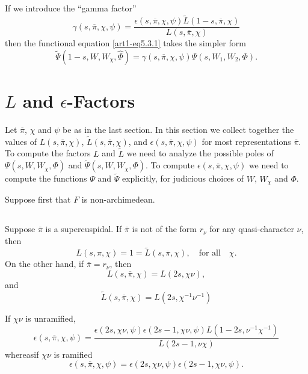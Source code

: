 \subsection{}\label{art1-sec5.5}
If we introduce the ``gamma factor''
$$
\gamma(s,\overline{\pi},\chi,\psi)=\dfrac{\epsilon(s,\overline{\pi},\chi,\psi)\widetilde{L}(1-s,\overline{\pi},\chi)}{L(s,\overline{\pi},\chi)}
$$
then the functional equation \eqref{art1-eq5.3.1} takes the simpler form
$$
\widetilde{\Psi}(1-s,W,W_{\chi},\widehat{\Phi})=\gamma(s,\overline{\pi},\chi,\psi)\Psi(s,W_{1},W_{2},\Phi).
$$

\section{$L$ and $\epsilon$-Factors}\label{art1-sec6}

Let $\overline{\pi}$, $\chi$ and $\psi$ be as in the last section. In this section we collect together the values of $L(s,\overline{\pi},\chi)$, $\widetilde{L}(s,\overline{\pi},\chi)$, and $\epsilon(s,\overline{\pi},\chi,\psi)$ for most representations $\overline{\pi}$. To compute the factors $L$ and $\widetilde{L}$ we need to analyze the possible poles of $\Psi(s,W,W_{\chi},\Phi)$ and $\widetilde{\Psi}(s,W,W_{\chi},\Phi)$. To compute $\epsilon(s,\overline{\pi},\chi,\psi)$ we need to compute the functions $\Psi$ and $\widetilde{\Psi}$ explicitly, for judicious choices of $W$, $W_{\chi}$ and $\Phi$.

Suppose first that $F$ is non-archimedean.

\subsection{}\label{art1-sec6.1}
Suppose $\overline{\pi}$ is a supercuspidal. If $\overline{\pi}$ is not of the form $r_{\nu}$ for any quasi-character $\nu$, then
$$
L(s,\pi,\chi)=1=\widetilde{L}(s,\overline{\pi},\chi),\quad\text{for all}\quad \chi.
$$
On the other hand, if $\overline{\pi}=r_{\nu}$, then
$$
L(s,\overline{\pi},\chi)=L(2s,\chi\nu),
$$
and
$$
\widetilde{L}(s,\overline{\pi},\chi)=L(2s,\chi^{-1}\nu^{-1})
$$

If $\chi\nu$ is unramified,
$$
\epsilon(s,\overline{\pi},\chi,\psi)=\frac{\epsilon(2s,\chi\nu,\psi)\epsilon(2s-1,\chi\nu,\psi)L(1-2s,\nu^{-1}\chi^{-1})}{L(2s-1,\nu\chi)}
$$
whereas\pageoriginale if $\chi\nu$ is ramified
$$
\epsilon(s,\overline{\pi},\chi,\psi)=\epsilon(2s,\chi\nu,\psi)\epsilon(2s-1,\chi\nu,\psi).
$$

